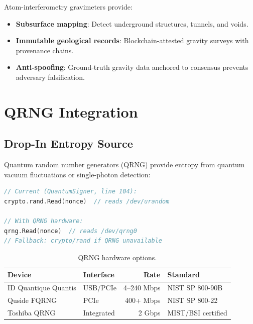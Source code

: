 \documentclass[11pt,letterpaper]{article}
\begin{document}
Atom-interferometry gravimeters provide:

\begin{itemize}
\item \textbf{Subsurface mapping}: Detect underground structures, tunnels, and voids.
\item \textbf{Immutable geological records}: Blockchain-attested gravity surveys with provenance chains.
\item \textbf{Anti-spoofing}: Ground-truth gravity data anchored to consensus prevents adversary falsification.
\end{itemize}

\section{QRNG Integration}

\subsection{Drop-In Entropy Source}

Quantum random number generators (QRNG) provide entropy from quantum vacuum fluctuations or single-photon detection:

\begin{lstlisting}[language=Go,caption={QRNG entropy source replacement.}]
// Current (QuantumSigner, line 104):
crypto.rand.Read(nonce)  // reads /dev/urandom

// With QRNG hardware:
qrng.Read(nonce)  // reads /dev/qrng0
// Fallback: crypto/rand if QRNG unavailable
\end{lstlisting}

\begin{table}[H]
\centering
\begin{tabular}{@{}llrl@{}}
\toprule
\textbf{Device} & \textbf{Interface} & \textbf{Rate} & \textbf{Standard} \\
\midrule
ID Quantique Quantis & USB/PCIe & 4--240 Mbps & NIST SP 800-90B \\
Quside FQRNG & PCIe & 400+ Mbps & NIST SP 800-22 \\
Toshiba QRNG & Integrated & 2 Gbps & MIST/BSI certified \\
\bottomrule
\end{tabular}
\caption{QRNG hardware options.}
\label{tab:qrng}
\end{table}
\end{document}

